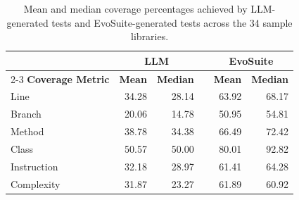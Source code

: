 \begin{table}[htbp]
\centering
\small
\caption{Mean and median coverage percentages achieved by LLM-generated tests and EvoSuite-generated tests across the 34 sample libraries.}
\label{tab:coverage-summary}
\begin{tabularx}{\columnwidth}{@{} X r r c r r @{}}
\toprule
 & \multicolumn{2}{c}{\textbf{LLM}} & & \multicolumn{2}{c}{\textbf{EvoSuite}} \\
\cmidrule{2-3} \cmidrule{5-6}
\textbf{Coverage Metric} & \textbf{Mean} & \textbf{Median} & & \textbf{Mean} & \textbf{Median} \\
\midrule
Line        & 34.28 & 28.14 & & 63.92 & 68.17 \\
Branch      & 20.06 & 14.78 & & 50.95 & 54.81 \\
Method      & 38.78 & 34.38 & & 66.49 & 72.42 \\
Class       & 50.57 & 50.00 & & 80.01 & 92.82 \\
Instruction & 32.18 & 28.97 & & 61.41 & 64.28 \\
Complexity  & 31.87 & 23.27 & & 61.89 & 60.92 \\
\bottomrule
\end{tabularx}
\end{table}
